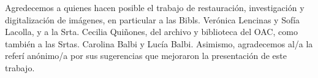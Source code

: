 \documentclass[baaa]{baaa}
\begin{document}
\begin{acknowledgement}
Agredecemos a quienes hacen posible el trabajo de restauración, investigación y digitalización de imágenes, en particular a las Bibls. Verónica Lencinas y Sofía Lacolla,
y a la Srta. Cecilia Quiñones, del archivo y biblioteca del OAC, como también a las Srtas. Carolina Balbi y Lucía Balbi. 
Asimismo, agradecemos al/a la referí anónimo/a por sus sugerencias que mejoraron la presentación de este trabajo. 
\end{acknowledgement}



\small

 
\end{document}
